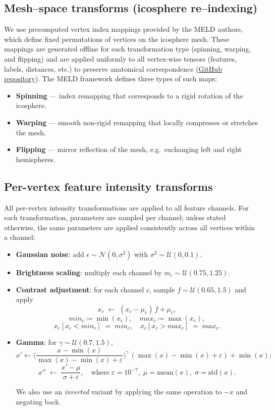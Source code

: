 \documentclass[FCD_GNN.tex]{subfiles}
\begin{document}
\subsection*{Mesh--space transforms (icosphere re–indexing)}
We use precomputed vertex index mappings provided by the MELD authors, 
which define fixed permutations of vertices on the icosphere mesh. 
These mappings are generated offline for each transformation type 
(spinning, warping, and flipping) and are applied uniformly to all vertex-wise tensors 
(features, labels, distances, etc.) to preserve anatomical correspondence (\href{https://github.com/MELDProject/meld_graph/tree/main/data}{GitHub repository}).
The MELD framework defines three types of such maps:
\begin{itemize}
  \item \textbf{Spinning} — index remapping that corresponds to a rigid rotation of the icosphere.
  \item \textbf{Warping} — smooth non-rigid remapping that locally compresses or stretches the mesh.
  \item \textbf{Flipping} — mirror reflection of the mesh, e.g.\ exchanging left and right hemispheres. 
\end{itemize}

\subsection*{Per-vertex feature intensity transforms}
All per-vertex intensity transformations are applied to all feature channels. 
For each transformation, parameters are sampled per channel; 
unless stated otherwise, the same parameters are applied consistently across all vertices within a channel:
\begin{itemize}
\item \textbf{Gaussian noise}: add $\epsilon\sim\mathcal{N}(0,\sigma^2)$ with $\sigma^2 \sim \mathcal{U}(0,0.1)$.
\item \textbf{Brightness scaling}: multiply each channel by $m_c\sim\mathcal{U}(0.75,1.25)$.
\item \textbf{Contrast adjustment}: for each channel $c$, sample $f\sim\mathcal{U}(0.65,1.5)$ and apply
\[
x_c \;\leftarrow\; (x_c - \mu_c)\,f + \mu_c,
\]
\[min_c \coloneqq \min(x_c), \quad
max_c \coloneqq \max(x_c),
\]
\[
x_c[x_c < min_c] \;=\; min_c, \quad
x_c[x_c > max_c] \;=\; max_c.
\]
\item \textbf{Gamma}: for $\gamma\sim\mathcal{U}(0.7,1.5)$,
\[
x' \leftarrow \Big(\frac{x-\min(x)}{\max(x)-\min(x)+\varepsilon}\Big)^{\gamma}\,(\max(x)-\min(x)+\varepsilon)+\min(x);
\]
\[
x'' \;\leftarrow\; \frac{x' - \mu}{\sigma + \varepsilon},
\quad \text{where } \varepsilon = 10^{-7},\;
\mu = \mathrm{mean}(x),\;
\sigma = \mathrm{std}(x).
\]

We also use an \emph{inverted} variant by applying the same operation to $-x$ and negating back.
\end{itemize}
\end{document}
